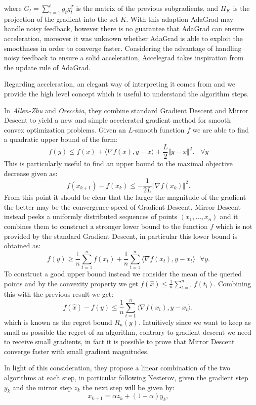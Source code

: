 \documentclass[12pt]{article}
\theoremstyle{definition}
\begin{document}
where $G_t = \sum_{\tau=1}^t g_t g_t^T $ is the matrix of the previous subgradients, and $\Pi_K$ is the projection of the gradient into the set $K$. 
With this adaption AdaGrad may handle noisy feedback, however there is no guarantee that AdaGrad can ensure acceleration, moreover it was unknown whether AdaGrad is able to exploit the smoothness in order to converge faster. Considering the advantage of handling noisy feedback to ensure a solid acceleration, Accelegrad takes inspiration from the update rule of AdaGrad. 

Regarding acceleration, an elegant way of interpreting it comes from \cite{linearcup} and we provide the high level concept which is useful to understand the algorithm steps. 

In \emph{Allen-Zhu} and \emph{Orecchia}, they combine standard Gradient Descent and Mirror Descent to yield a new and simple accelerated gradient method for smooth convex optimization problems.
Given an $L$-smooth function $f$ we are able to find a quadratic upper bound of the form:
$$
f(y) \leq f(x) + \langle \nabla f(x),y-x \rangle + \frac{L}{2} \Vert y - x \Vert^2. \ \ \ \ \forall y
$$
This is particularly useful to find an upper bound to the maximal objective decrease given as:
$$
f(x_{k+1})-f(x_k) \leq - \frac{1}{2L}\Vert \nabla f(x_k) \Vert^2.
$$
From this point it should be clear that the larger the magnitude of the gradient the better may be the convergence speed of Gradient Descent. Mirror Descent instead peeks a uniformly distributed sequences of points $(x_1,\dots,x_n)$ and it combines them to construct a stronger lower bound to the function $f$ which is not provided by the standard Gradient Descent, in particular this lower bound is obtained as: 
$$
f(y) \geqslant \frac{1}{n} \sum_{t=1}^{n} f(x_t) + \frac{1}{n} \sum_{t=1}^{n} \langle \nabla f(x_t), y-x_t \rangle \ \ \ \forall y.
$$
To construct a good upper bound instead we consider the mean of the queried points and by the convexity property we get $f(\hat x) \leq \frac{1}{n} \sum_{t=1}^n f(t_i)$. Combining this with the previous result we get:
$$
f(\hat x) - f(y) \leq \frac{1}{n} \sum_{t=1}^{n} \langle \nabla f(x_t), y-x_t \rangle, 
$$ 
which is known as the regret bound $R_n(y)$. Intuitively since we want to keep as small as possible the regret of an algorithm, contrary to gradient descent we need to receive small gradients, in fact it is possible to prove that Mirror Descent converge faster with small gradient magnitudes. 

In light of this consideration, they propose a linear combination of the two algorithms at each step, in particular following Nesterov, given the gradient step $y_k$ and the mirror step $z_k$ the next step will be given by:
\begin{equation}
  x_{k+1} = \alpha z_k + (1-\alpha) y_k,
\end{equation}
\end{document}
